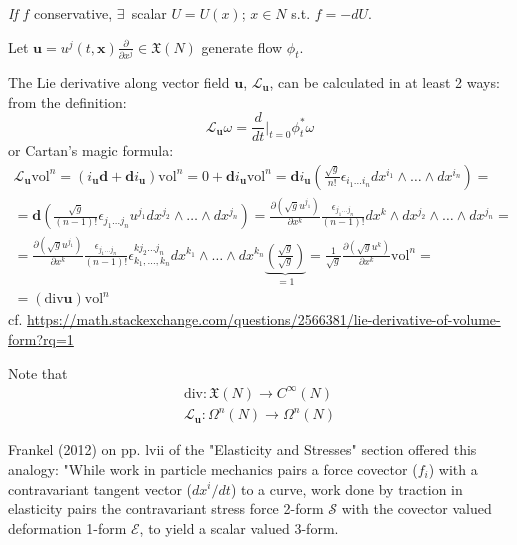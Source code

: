 \documentclass[10pt]{amsart}
\begin{document}
\begin{multicols*}{2}
\emph{If} $f$ conservative, $\exists\, $ scalar $U = U(x)$; $x\in N$ s.t. $f=-dU$.

Let $\mathbf{u} = u^j(t,\mathbf{x}) \frac{\partial}{ \partial x^j} \in \mathfrak{X}(N)$ generate flow $\phi_t$.

The Lie derivative along vector field $\mathbf{u}$, $\mathcal{L}_{\mathbf{u}}$, can be calculated in at least 2 ways: from the definition:
\[
\mathcal{L}_{\mathbf{u}} \omega  =\frac{d}{dt} \left. \right|_{t = 0} \phi_t^*\omega
\]
or Cartan's magic formula:
\begin{equation}
\begin{gathered}
	\mathcal{L}_{\mathbf{u}} \text{vol}^n = (i_{\mathbf{u}}\mathbf{d} + \mathbf{d}i_{\mathbf{u}}) \text{vol}^n = 0 + \mathbf{d}i_{\mathbf{u}} \text{vol}^n = \mathbf{d}i_{\mathbf{u}} \left( \frac{ \sqrt{g}}{n!} \epsilon_{i_1 \dots i_n} dx^{i_1} \wedge \dots \wedge dx^{i_n} \right) = \\ 
	= \mathbf{d} \left( \frac{\sqrt{g}}{(n-1)! } \epsilon_{j_1 \dots j_n} u^{j_1} dx^{j_2} \wedge \dots \wedge dx^{j_n} \right) = \frac{ \partial (\sqrt{g} u^{j_1} )}{ \partial x^k} \frac{ \epsilon_{j_1 \dots j_n}}{(n-1)!} dx^k \wedge dx^{j_2} \wedge \dots \wedge dx^{j_n} = \\
	= \frac{ \partial (\sqrt{g} u^{j_1}) }{ \partial x^k} \frac{ \epsilon_{j_1 \dots j_n} }{ (n-1)! } \epsilon^{k j_2 \dots j_n}_{ k_1, \dots, k_n} dx^{k_1} \wedge \dots \wedge dx^{k_n} \underbrace{\left( \frac{ \sqrt{g}}{ \sqrt{g}} \right)}_{=1} = \frac{1}{\sqrt{g}} \frac{ \partial ( \sqrt{g} u^k) }{ \partial x^k} \text{vol}^n =  \\
	= (\text{div}{\mathbf{u}}) \text{vol}^n
\end{gathered}
\end{equation}
cf. \url{https://math.stackexchange.com/questions/2566381/lie-derivative-of-volume-form?rq=1}

Note that
\[
\begin{gathered}
	\text{div}: \mathfrak{X}(N) \to C^{\infty}(N) \\ 
 \mathcal{L}_{\mathbf{u}}: \Omega^n(N) \to \Omega^n(N) 
\end{gathered}
\]

Frankel (2012) \cite{TFrankel2012} on pp. lvii of the "Elasticity and Stresses" section offered this analogy: "While work in particle mechanics pairs a force covector ($f_i$) with a contravariant tangent vector ($dx^i/dt$) to a curve, work done by traction in elasticity pairs the contravariant stress force 2-form $\mathcal{S}$ with the covector valued deformation 1-form $\mathcal{E}$, to yield a scalar valued 3-form.


\end{multicols*}
\end{document}
